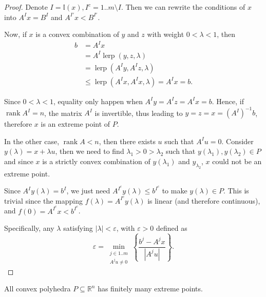\begin{proof}
  Denote \( I = \mathbb{I}(x), I^{c} = 1..m \setminus I \).
  Then we can rewrite the conditions of \( x \) into \( A^{I}x = B^{I} \) and \(
  A^{I'}x < B^{I'}\).

  Now, if \( x \) is a convex combination of \( y \) and \( z \) with weight \(
  0 < \lambda < 1\), then 
  \begin{align*}
    b &= A^{I}x\\
      &= A^{I} \operatorname{lerp}(y, z, \lambda)\\
      &= \operatorname{lerp}(A^{I}y, A^{I}z, \lambda)\\
      &\le \operatorname{lerp}(A^{I}x, A^{I}x, \lambda) = A^{I}x = b
  .\end{align*}

  Since \( 0 < \lambda < 1 \), equality only happen when \( A^{I}y = A^{I}z =
  A^{I}x = b \). Hence, if \( \operatorname{rank} A^{I} = n \), the matrix \(
  A^{I} \) is invertible, thus leading to \( y = z = x =(A^{I})^{-1} b \),
  therefore \( x \) is an extreme point of \( P \).

  In the other case, \( \operatorname{rank} A < n \), then there exists \( u \)
  such that \( A^{I}u = 0 \). Consider \( y(\lambda) = x +\lambda u \), then 
  we need to find \( \lambda_{1} > 0 > \lambda_{2} \) such that \(
  y(\lambda_{1}), y(\lambda_{2}) \in P \) and since \( x \) is a strictly convex
  combination of \( y(\lambda_{1}) \) and \( y_{\lambda_{2}} \), \( x \) could
  not be an extreme point.

  Since \( A^{I}y(\lambda) = b^{I} \), we just need \( A^{I^{c}}y(\lambda) \le
  b^{I^{c}} \) to make \( y(\lambda) \in P \). This is trivial since the mapping
  \( f(\lambda) = A^{I^{c}}y(\lambda) \) is linear (and therefore continuous),
  and \( f(0) = A^{I^{c}} x < b^{I^{c}} \).

  Specifically, any \( \lambda \) satisfying \( |\lambda| < \varepsilon \), with
  \( \varepsilon > 0 \) defined as
  \[
    \varepsilon = \min_{\substack{j \in 1..m\\ A^{j}u \neq 0}} \left\{   \frac{b^{j} - A^{j}x}{|A^{j}u|}
  \right\}  
  .\] 
\end{proof}

\begin{corollary}
\label{cor:Finiteness of extreme points in convex polyhedra}
  All convex polyhedra \( P \subseteq \mathbb{R}^{n} \) has finitely many
  extreme points.
\end{corollary}

